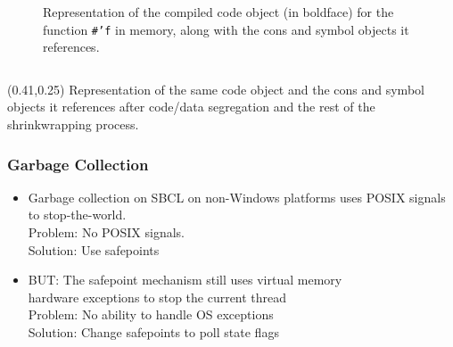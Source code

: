 \documentclass[14pt,t,aspectratio=169]{beamer}
\begin{document}
\begin{frame}
  \begin{figure}
    \begin{columns}
      \vspace{-2em}
      \phantom{123}
      
      Representation of the compiled code object (in boldface)
      for the function \protect\texttt{\#'f} in memory, along with the
      cons and symbol objects it references.
    \end{columns}
  \end{figure}
\end{frame}

\begin{frame}
    

    \setlength{\TPHorizModule}{\textwidth}
    \setlength{\TPVertModule}{\textwidth}
    \begin{textblock}{0.5}(0.41,0.25)
      Representation of the same code object and the cons and
      symbol objects it references after code/data segregation and the
      rest of the shrinkwrapping process.
    \end{textblock}
\end{frame}

\begin{frame}
  \frametitle{Garbage Collection}
  \begin{itemize}
  \item Garbage collection on SBCL on non-Windows platforms uses POSIX
    signals to stop-the-world. \\
    \textcolor{red}{\Rightarrow} Problem: No POSIX signals. \\
    \Rightarrow{} Solution: Use safepoints
  \item BUT: The safepoint mechanism still uses virtual memory \\
    hardware exceptions to stop the current thread \\
  \textcolor{red}{\Rightarrow} Problem: No ability to handle OS exceptions \\
  \Rightarrow{} Solution: Change safepoints to poll state flags
  \end{itemize}
\end{frame}
\end{document}
